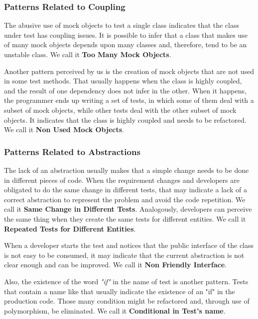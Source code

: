 \documentclass[conference]{IEEEtran}
\begin{document}
\subsubsection{Patterns Related to Coupling}

The abusive use of mock objects to test a single class indicates that
the class under test has coupling issues. It is possible to infer that a class
that makes use of many mock objects depends upon many classes and, therefore,
tend to be an unstable class. We call it \textbf{Too Many Mock Objects}.

Another pattern perceived by us is the creation of mock objects that are
not used in some test methods. That usually happens when the class
is highly coupled, and the result of one dependency does not infer in
the other. When it happens, the programmer ends up writing a set of tests,
in which some of them deal with a subset of mock objects, while other
tests deal with the other subset of mock objects. It indicates that
the class is highly coupled and needs to be refactored. We call it
\textbf{Non Used Mock Objects}.

\subsubsection{Patterns Related to Abstractions}

The lack of an abstraction usually makes that a simple change needs to
be done in different pieces of code. When the requirement changes and
developers are obligated to do the same change in different tests,
that may indicate a lack of a correct abstraction to represent the problem
and avoid the code repetition. We call it \textbf{Same Change in Different Tests}.
Analogously, developers can perceive the same thing when they create the
same tests for different entities. We call it \textbf{Repeated Tests for Different Entities}.

When a developer starts the test and notices that the public interface of the class
is not easy to be consumed, it may indicate that the current abstraction is not
clear enough and can be improved. We call it \textbf{Non Friendly Interface}.

Also, the existence of the word \textit{"if"} in the name of test is another
pattern. Tests that contain a name like that usually indicate the existence
of an "if" in the production code. Those many condition might be refactored and,
through use of polymorphism, be eliminated. We call it \textbf{Conditional in Test's name}.
\end{document}

